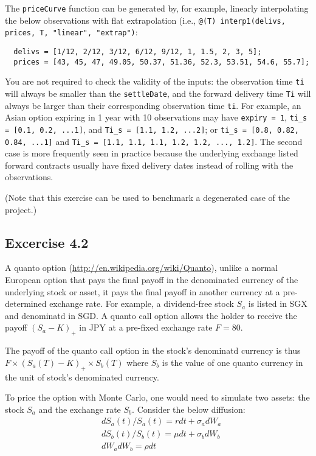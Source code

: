 \documentclass[10pt,a4paper,hidelinks,fleqn]{article}            %
\begin{document}
The \verb=priceCurve= function can be generated by, for example, linearly interpolating the below observations with flat extrapolation (i.e., \verb=@(T) interp1(delivs, prices, T, "linear", "extrap")=:
\vspace{-0.6cm}
\begin{verbatim}
  delivs = [1/12, 2/12, 3/12, 6/12, 9/12, 1, 1.5, 2, 3, 5];
  prices = [43, 45, 47, 49.05, 50.37, 51.36, 52.3, 53.51, 54.6, 55.7];
\end{verbatim}
You are not required to check the validity of the inputs:
the observation time \verb=ti= will always be smaller than the \verb=settleDate=, and the forward delivery time \verb=Ti= will always be larger than their corresponding observation time \verb=ti=.
For example, an Asian option expiring in 1 year with 10 observations may have \verb_expiry = 1_, \verb+ti_s = [0.1, 0.2, ...1]+, and \verb+Ti_s = [1.1, 1.2, ...2]+;
or \verb+ti_s = [0.8, 0.82, 0.84, ...1]+ and \verb+Ti_s = [1.1, 1.1, 1.1, 1.2, 1.2, ..., 1.2]+. The second case is more frequently seen in practice because the underlying exchange listed forward contracts usually have fixed delivery dates instead of rolling with the observations.

(Note that this exercise can be used to benchmark a degenerated case of the project.)
\subsection*{Excercise 4.2}
A quanto option (\url{http://en.wikipedia.org/wiki/Quanto}), unlike a normal European option that pays the final payoff in the denominated currency of the underlying stock or asset,
it pays the final payoff in another currency at a pre-determined exchange rate.
For example, a dividend-free stock $S_a$ is listed in SGX and denominatd in SGD. 
A quanto call option allows the holder to receive the payoff $(S_a-K)_+$ in JPY at a pre-fixed exchange rate $F = 80$. 

The payoff of the quanto call option in the stock's denominatd currency is thus 
$F \times (S_a(T)-K)_+ \times S_b(T)$ where $S_b$ is the value of one quanto currency in the unit of stock's denominated currency.

To price the option with Monte Carlo, one would need to simulate two assets: the stock $S_a$ and the exchange rate $S_b$.
Consider the below diffusion:
\begin{align}
& dS_a(t) / S_a(t) = r dt + \sigma_a dW_a \\
& dS_b(t) / S_b(t) = \mu dt + \sigma_b dW_b \\
& dW_a dW_b = \rho dt
\end{align}
\end{document}
